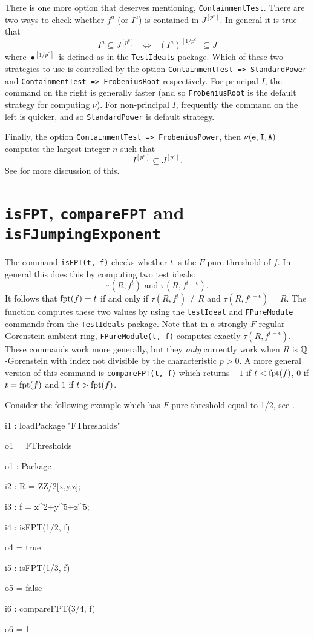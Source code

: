 \documentclass{amsart}
\begin{document}
There is one more option that deserves mentioning, {\tt ContainmentTest}.  There are two ways to check whether $f^a$ (or $I^a$) is contained in $J^{[p^e]}$.  In general it is true that
\[
I^a \subseteq J^{[p^e]} \text{ $\Leftrightarrow$ } (I^a)^{[1/p^e]} \subseteq J
\]
where $\bullet^{[1/p^e]}$ is defined as in the {\tt TestIdeals} package.  Which of these two strategies to use is controlled by the option {\tt ContainmentTest => StandardPower} and {\tt ContainmentTest => FrobeniusRoot} respectively.
For principal $I$, the command on the right is generally faster (and so {\tt FrobeniusRoot} is the default strategy for computing $\nu$).  For non-principal $I$, frequently the command on the left is quicker, and so {\tt StandardPower} is default strategy. 

Finally, the option {\tt ContainmentTest => FrobeniusPower}, then ${\tt \nu(e, I, A)}$ computes the largest integer $n$ such that
\[
I^{[p^n]} \subseteq J^{[p^e]}.
\]
See \cite{HernandezTeixeiraWittFrobeniusPowers} for more discussion of this.  

\section{{\tt isFPT}, {\tt compareFPT} and {\tt isFJumpingExponent}}
\label{sec.IsFPT}

The command {\tt isFPT(t, f)} checks whether $t$ is the $F$-pure threshold of $f$.  In general this does this by computing two test ideals:
\[
\tau(R, f^t) \text{ and } \tau(R, f^{t-\epsilon}).
\]
It follows that $\operatorname{{fpt}}(f) = t$ if and only if $\tau(R, f^t) \neq R$ and $\tau(R, f^{t-\epsilon}) = R$.  The function computes these two values by using the {\tt testIdeal} and {\tt FPureModule} commands from the {\tt TestIdeals} package.  Note that in a strongly $F$-regular Gorenstein ambient ring, {\tt FPureModule(t, f)} computes exactly $\tau(R, f^{t-\epsilon})$.  These commands work more generally, but they \emph{only} currently work when $R$ is $\mathbb{Q}$-Gorenstein with index not divisible by the characteristic $p > 0$.  A more general version of this command is {\tt compareFPT(t, f)} which returns $-1$ if $t < \operatorname{{fpt}}(f)$, $0$ if $t = \operatorname{{fpt}}(f)$ and $1$ if $t > \operatorname{{fpt}}(f)$.  

Consider the following example which has $F$-pure threshold equal to {1/2}, see \cite[Example 4.3]{MustataYoshidaTestIdealVsMultiplierIdeals}.
\medskip
{\small
{}
\begin{MyVerbatim}
i1 : loadPackage "FThresholds"

o1 = FThresholds

o1 : Package

i2 : R = ZZ/2[x,y,z];

i3 : f = x^2+y^5+z^5;

i4 : isFPT(1/2, f)

o4 = true

i5 : isFPT(1/3, f)

o5 = false

i6 : compareFPT(3/4, f)

o6 = 1
\end{MyVerbatim}
}
\medskip
\end{document}
